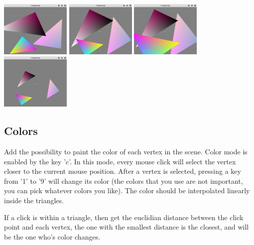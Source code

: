 \documentclass[11pt]{article}
\begin{document}
\includegraphics[width=0.25\textwidth]{rot.png}
\includegraphics[width=0.25\textwidth]{rot2.png}
\includegraphics[width=0.25\textwidth]{rot3.png}
\includegraphics[width=0.25\textwidth]{rot4.png}

\newpage
\subsection{Colors}

Add the possibility to paint the color of each vertex in the scene. Color mode is enabled by the key 'c'. In this mode, every mouse click will select the vertex closer to the current mouse position. After a vertex is selected, pressing a key from '1' to '9' will change its color (the colors that you use are not important, you can pick whatever colors you like). The color should be interpolated linearly inside the triangles.

If a click is within a triangle, then get the euclidian distance between the click point and each vertex, the one with the smallest distance is the closest, and will be the one who's color changes.
\end{document}
